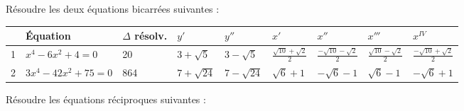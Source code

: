 \begin{landscape}
\begin{solution}
Résoudre les deux équations bicarrées suivantes :

\begin{tabular}{|l|l|l|l|l|l|l|l|l|}
\hline
  & Équation                      & $\Delta $ résolv. & ${y}'$        & ${y}''$       & ${x}'$                         & ${x}''$                         & ${x}'''$                       & ${{x}^{IV}}$                    \\ \hline
1 & ${{x}^{4}}-6{{x}^{2}}+4=0$    & 20                & $3+\sqrt{5}$  & $3-\sqrt{5}$  & $\frac{\sqrt{10}+\sqrt{2}}{2}$ & $\frac{-\sqrt{10}-\sqrt{2}}{2}$ & $\frac{\sqrt{10}-\sqrt{2}}{2}$ & $\frac{-\sqrt{10}+\sqrt{2}}{2}$ \\ \hline
2 & $3{{x}^{4}}-42{{x}^{2}}+75=0$ & 864               & $7+\sqrt{24}$ & $7-\sqrt{24}$ & $\sqrt{6}+1$                   & $-\sqrt{6}-1$                   & $\sqrt{6}-1$                   & $-\sqrt{6}+1$                   \\ \hline
\end{tabular}
\end{solution}

\begin{solution}
Résoudre les équations réciproques suivantes :


\end{solution}
\end{landscape}
